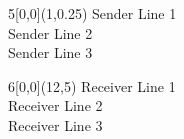 \documentclass[12pt]{scrartcl}
\begin{document}
\ocrfamily 
 
\begin{textblock}{5}[0,0](1,0.25)\footnotesize
Sender Line 1\\
Sender Line 2 \\
Sender Line 3
\end{textblock}
 
\begin{textblock}{6}[0,0](12,5)%
Receiver Line 1 \\
Receiver Line 2 \\
Receiver Line 3 
\end{textblock}
 
\end{document}
